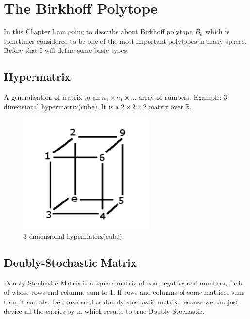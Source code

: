 
\chapter{The Birkhoff Polytope} %

\label{ChapterX} %



In this Chapter I am going to describe about Birkhoff polytope $B_n$ which is sometimes considered to be one of the most important polytopes in many sphere. Before that I will define some basic types.
\section{Hypermatrix}

A generalisation of matrix to an $n_1 \times n_1 \times ...$ array of numbers. \newline
Example: 3-dimensional hypermatrix(cube). It is a $2 \times 2 \times 2$ matrix over $\mathbb{R}$.


\begin{figure}[h]
\centering
\includegraphics{Figures/hypercube.png}
\decoRule
\caption[hypercube]{3-dimensional hypermatrix(cube).}
\label{fig:hypercube}
\end{figure}

\section{Doubly-Stochastic Matrix}

Doubly Stochastic Matrix is a square matrix of non-negative real numbers, each of whose rows and columns sum to 1. If rows and columns of some matrices sum to n, it can also be considered as doubly stochastic matrix because we can just device all the entries by n, which results to true Doubly Stochastic.\\


